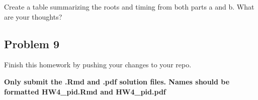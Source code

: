 \documentclass[]{article}
\begin{document}
Create a table summarizing the roots and timing from both parts a and b.
What are your thoughts?

\hypertarget{problem-9}{%
\subsection{Problem 9}\label{problem-9}}

Finish this homework by pushing your changes to your repo.

\textbf{Only submit the .Rmd and .pdf solution files. Names should be
formatted HW4\_pid.Rmd and HW4\_pid.pdf}
\end{document}
